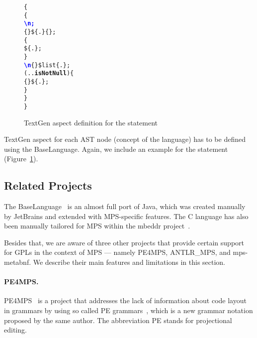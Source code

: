 \begin{figure}[ht]
\centering
\begin{alltt}
\small
{}  \{
   \{
     \textcolor{blue}{\textbf{\textbackslash{}n;}}
     \{\} \$\{.\} \{\mpstgliteral{) \{}\};
     \{
       \$\{.\};
    \}
     \textcolor{blue}{\textbf{\textbackslash{}n}} \{\mpstgliteral{\}}\} \$list\{.\};
     (..\textbf{isNotNull}) \{
       \{ \} \$\{.\};
    \}
  \}
\}
\end{alltt}
\caption{TextGen aspect definition for the  statement}
\label{fig:if_statement_textgen}
\end{figure}

TextGen aspect for each AST node (concept of the language) has to be defined using the BaseLanguage.
Again, we include an example for the  statement (Figure~\ref{fig:if_statement_textgen}).

\subsection{Related Projects}
\label{sect:RELATED}

The BaseLanguage~\cite{ref:BASELANG} is an almost full port of Java, which was created manually by JetBrains and extended with MPS-specific features.
The C language has also been manually tailored for MPS within the mbeddr project~\cite{ref:MBEDDR}.

Besides that, we are aware of three other projects that provide certain support for GPLs in the context of MPS --- namely PE4MPS, ANTLR{\_}MPS, and mps-metabnf.
We describe their main features and limitations in this section.

\paragraph{PE4MPS.}
PE4MPS~\cite{ref:PE4MPS} is a project that addresses the lack of information about code layout in grammars by using so called PE grammars~\cite{ref:PE}, which is a new grammar notation proposed by the same author.
The abbreviation PE stands for projectional editing.

